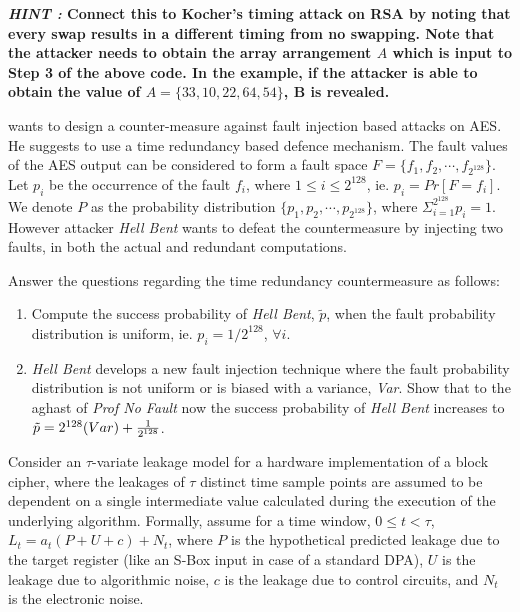 \documentclass{article}
\begin{document}
\begin{questions}
{\bf {\em HINT : } Connect this to Kocher's timing attack on RSA by noting that every swap results in a different 
timing from no swapping. Note that the attacker needs to obtain the 
array arrangement $A$ which is input to Step 3 of the above code. In the example, if the attacker is able to 
obtain the value of $A = \{33, 10, 22, 64, 54\}$, B is revealed.}



 wants to design a counter-measure against fault injection based attacks on AES. 
He suggests to use a time redundancy based defence mechanism. The fault values of the AES output can be 
considered to form a fault space $F=\{f_1,f_2,\cdots,f_{2^{128}}\}$. Let $p_i$ be the 
occurrence of the fault $f_i$, where $1 \leq i \leq 2^{128}$, ie. $p_i=Pr[F=f_i]$. We 
denote $P$ as the probability distribution $\{p_1,p_2,\cdots,p_{2^{128}}\}$, 
where $\Sigma_{i=1}^{2^{128}}p_i=1$. However attacker {\em Hell Bent} wants to defeat the 
countermeasure by injecting two faults, in both the actual and redundant computations.

Answer the questions regarding the time redundancy countermeasure as follows:
\begin{enumerate}
\item Compute the success probability of {\em Hell Bent}, $\tilde{p}$, when the fault probability distribution is 
uniform, ie. $p_i=1/2^{128}$, $\forall i$.

\item {\em Hell Bent} develops a new fault injection technique where the fault probability distribution is not 
uniform or is biased with a variance, {\em Var}. 
Show that to the aghast of {\em Prof No Fault} now the 
success probability of {\em Hell Bent} 
increases to $\tilde{p}=2^{128}(Var) + {1 \over 2^{128}}$.  
\end{enumerate}

\question Consider an $\tau$-variate leakage model for a hardware implementation of a block cipher, where the leakages of 
$\tau$ distinct time sample points are assumed to be dependent on a single intermediate 
value calculated during the execution of the underlying algorithm. Formally, 
assume for a time window, $0 \leq t < \tau$, 
$L_t=a_t(P+U+c)+N_t$, where $P$ is the hypothetical predicted leakage 
due to the target register (like an S-Box input in case of a standard DPA), 
$U$ is the leakage due to algorithmic noise, $c$ is the leakage due to 
control circuits, and $N_t$ is the electronic noise.


\end{questions}
\end{document}
